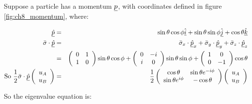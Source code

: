 Suppose a particle has a momentum $\underline{p}$, with coordinates defined in figure \ref{fig:ch8_momentum}, where:

\begin{eqnarray*}
  \underline{\hat{p}} & = & \sin\theta\cos\phi\hat{\underline{i}} + \sin\theta\sin\phi\hat{\underline{j}} + \cos\theta\hat{\underline{k}} \\
  \bar{\sigma}\cdot\underline{\hat{p}} & = & \bar{\sigma}_x\cdot\underline{\hat{p}}_x + \bar{\sigma}_y\cdot\underline{\hat{p}}_y + \bar{\sigma}_z\cdot\underline{\hat{p}}_z \\
  & = &
  \left(
    \begin{array}{cc}
    0 & 1 \\
    1 & 0
    \end{array}
  \right)
  \sin\theta\cos\phi
  +
  \left(
    \begin{array}{cc}
    0 & -i \\
    i & 0
    \end{array}
  \right)
  \sin\theta\sin\phi
  +
  \left(
    \begin{array}{cc}
    1 & 0 \\
    0 & -1
    \end{array}
  \right)
  \cos\theta
  \\
  \textrm{So } \frac{1}{2}\bar{\sigma}\cdot\underline{\hat{p}}
  \left(
    \begin{array}{c}
    u_A \\
    u_B
    \end{array}
  \right)
  & = & \frac{1}{2}
  \left(
    \begin{array}{cc}
    \cos\theta & \sin\theta e^{-i\phi} \\
    \sin\theta e^{i\phi} & -\cos\theta
    \end{array}
  \right)
  \left(
    \begin{array}{c}
    u_A \\
    u_B
    \end{array}
  \right)
\end{eqnarray*}

So the eigenvalue equation is:


